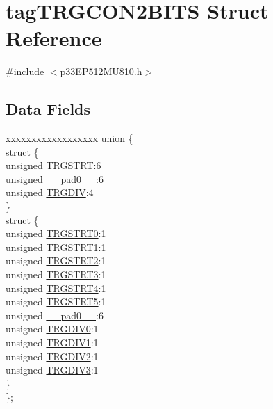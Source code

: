 \hypertarget{structtag_t_r_g_c_o_n2_b_i_t_s}{}\section{tag\+T\+R\+G\+C\+O\+N2\+B\+I\+TS Struct Reference}
\label{structtag_t_r_g_c_o_n2_b_i_t_s}


{\ttfamily \#include $<$p33\+E\+P512\+M\+U810.\+h$>$}

\subsection*{Data Fields}
\begin{DoxyCompactItemize}
\item 
\begin{tabbing}
xx\=xx\=xx\=xx\=xx\=xx\=xx\=xx\=xx\=\kill
union \{\\
\>struct \{\\
\>\>unsigned \hyperlink{structtag_t_r_g_c_o_n2_b_i_t_s_a53d84dcc3e23b3d2db356ea32c245b6f}{TRGSTRT}:6\\
\>\>unsigned \hyperlink{structtag_t_r_g_c_o_n2_b_i_t_s_adf71f3d8410c1f1dbbc96680a92c49af}{\_\_pad0\_\_}:6\\
\>\>unsigned \hyperlink{structtag_t_r_g_c_o_n2_b_i_t_s_a10310cfb772e07d5f62911d0619c3ae0}{TRGDIV}:4\\
\>\} \\
\>struct \{\\
\>\>unsigned \hyperlink{structtag_t_r_g_c_o_n2_b_i_t_s_a75147b4831d3afa487fe9999d2a58c67}{TRGSTRT0}:1\\
\>\>unsigned \hyperlink{structtag_t_r_g_c_o_n2_b_i_t_s_ac76b84548f8cfa382a2d703890b58dad}{TRGSTRT1}:1\\
\>\>unsigned \hyperlink{structtag_t_r_g_c_o_n2_b_i_t_s_a66e40dba969f7a5eafe81b8f341dd665}{TRGSTRT2}:1\\
\>\>unsigned \hyperlink{structtag_t_r_g_c_o_n2_b_i_t_s_a20e528d9be27fc91e2d28bb69f809c0a}{TRGSTRT3}:1\\
\>\>unsigned \hyperlink{structtag_t_r_g_c_o_n2_b_i_t_s_a9e26684d05dfb877c150795a627387cc}{TRGSTRT4}:1\\
\>\>unsigned \hyperlink{structtag_t_r_g_c_o_n2_b_i_t_s_aabeb06bb6258310e01e1a0cd96bf30ca}{TRGSTRT5}:1\\
\>\>unsigned \hyperlink{structtag_t_r_g_c_o_n2_b_i_t_s_adf71f3d8410c1f1dbbc96680a92c49af}{\_\_pad0\_\_}:6\\
\>\>unsigned \hyperlink{structtag_t_r_g_c_o_n2_b_i_t_s_a6d425374bc65bb89be540344ef5393e5}{TRGDIV0}:1\\
\>\>unsigned \hyperlink{structtag_t_r_g_c_o_n2_b_i_t_s_a92a66ed2923cfb0f855e3d9fe36654f9}{TRGDIV1}:1\\
\>\>unsigned \hyperlink{structtag_t_r_g_c_o_n2_b_i_t_s_a8a4ec980bd7f8bdb174f00a7888cdfce}{TRGDIV2}:1\\
\>\>unsigned \hyperlink{structtag_t_r_g_c_o_n2_b_i_t_s_a0b99e8f3f8539f9bf133127a32824612}{TRGDIV3}:1\\
\>\} \\
\}; \\


\end{tabbing}
\end{DoxyCompactItemize}
